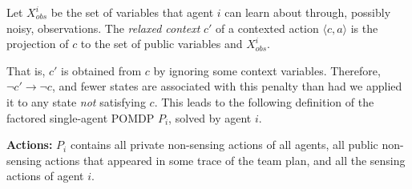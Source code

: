 \documentclass[runningheads]{llncs}
\newcommand{\ronen}[1]{\textbf{[\color{blue}RONEN:#1]}}
\begin{document}


\begin{definition}
Let $X^i_{obs}$ be the set of variables that agent $i$ can learn
about through, possibly noisy, observations. The {\em relaxed context} $c'$ of a contexted action $\langle c,a\rangle$ is the projection of $c$ to the set of public variables and $X^i_{obs}$.
\end{definition}
That is, $c'$ is obtained from $c$ by ignoring some context variables.
Therefore, $\neg c'\rightarrow \neg c$, and fewer states are associated with this penalty than had we applied it to any state {\em not} satisfying $c$.
%
This leads to the following definition of the factored single-agent POMDP $P_i$, solved by agent $i$. 

{\bf Actions:} $P_i$ contains all private non-sensing actions of all agents, all public non-sensing actions that appeared in some trace of the team plan, and all the sensing actions of agent $i$.
\end{document}
